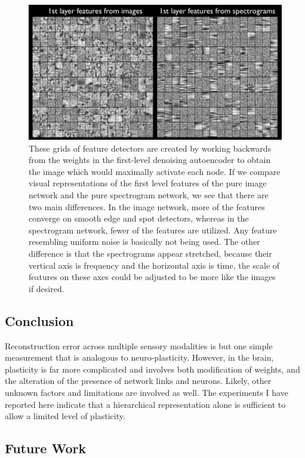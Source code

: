 \documentclass[12pt]{article}
\begin{document}
\begin{doublespacing}
\begin{figure}[p]
\centering
\includegraphics[width=6in]{feature_comparison}
\caption{These grids of feature detectors are created by working backwards from the weights in the first-level denoising autoencoder to obtain the image which would maximally activate each node. If we compare visual representations of the first level features of the pure image network and the pure spectrogram network, we see that there are two main differences. In the image network, more of the features converge on smooth edge and spot detectors, whereas in the spectrogram network, fewer of the features are utilized. Any feature resembling uniform noise is basically not being used. The other difference is that the spectrograms appear stretched, because their vertical axis is frequency and the horizontal axis is time, the scale of features on these axes could be adjusted to be more like the images if desired.}
\label{fig:feature_comparison}
\end{figure}
	

	
	\subsection{Conclusion}
		
	Reconstruction error across multiple sensory modalities is but one simple measurement that is analogous to neuro-plasticity. However, in the brain, plasticity is far more complicated and involves both modification of weights, and the alteration of the presence of network links and neurons. Likely, other unknown factors and limitations are involved as well. The experiments I have reported here indicate that a hierarchical representation alone is sufficient to allow a limited level of plasticity.
	
	\subsection{Future Work}

\end{doublespacing}

\nocite{huiskes08}

\singlespacing


\end{document}
